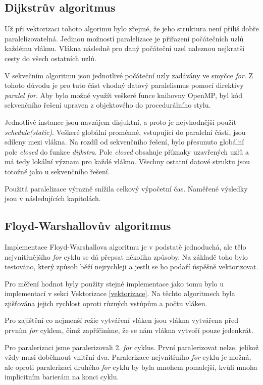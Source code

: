 \documentclass[a4paper,11pt]{article}
\begin{document}
\subsection{Dijkstrův algoritmus}
Už při vektorizaci tohoto algorimu bylo zřejmé, že jeho struktura není příliš dobře paralelizovatelná. Jedinou možností paralelizace je přiřazení počátečních uzlů každému vláknu. Vlákna následně
pro daný počáteční uzel naleznou nejkratší cesty do všech ostatních uzlů.

V sekvečním algoritmu jsou jednotlivé počáteční uzly zadávány ve smyčce \textit{for}. Z tohoto důvodu je pro tuto část vhodný datový paralelismus pomocí direktivy \textit{paralel for}.
Aby bylo možné využít veškeré funce knihovny OpenMP, byl kód sekvenčního řešení upraven z objektového do procedurálního stylu.

Jednotlivé instance jsou navzájem disjuktní, a proto je nejvhodnější použít \textit{schedule(static)}. Veškeré globální proménné, vstupující do paralelní části, jsou sdíleny mezi vlákna.
Na rozdíl od sekvenčního řešení, bylo přesunuto globální pole \textit{closed} do funkce \textit{dijkstra}. Pole \textit{closed} obsahuje příznaky uzavřených uzlů a má tedy lokální význam pro 
každé vlákno. Všechny ostatní datové struktu jsou totožné jako u sekvenčního řešení.

Použitá paralelizace výrazně snížila celkový výpočetní čas. Naměřené výsledky jsou v následujících kapitolách.

\subsection{Floyd-Warshallovův algoritmus}
Implementace Floyd-Warshallova algoritmu je v podstatě jednoduchá, ale tělo nejvnitřnějšího \textit{for} cyklu se dá přepsat několika způsoby.
Na základě toho bylo testováno, který způsob běží nejrychleji a jestli se ho podaří úspěšně vektorizovat. 

Pro měření hodnot byly použity stejné implementace jako tomu bylo u implementací v sekci Vektorizace \ref{vektorizace}. Na
těchto algoritmech byla zjišťována jejich rychlost oproti různých vstůpům a počtu vláken.

Pro zajištění co nejmenší režie vytváření vláken jsou vlákna vytvářena před prvním \textit{for} cyklem,
čímž zapříčiníme, že se nám vlákna vytvoří pouze jedenkrát.

Pro paralerizaci jsme paralerizovali 2. \textit{for} cyklus. První paralerizovat nelze, jelikož vždy musi doběhnout
vnitřní dva. Paralerizace nejvnitřního \textit{for} cyklu je možná, ale oproti paralerizaci druhého \textit{for} 
cyklu by
byla mnohem pomalejší, kvůli mnoha implicitním barierám na konci cyklu.
\end{document}

